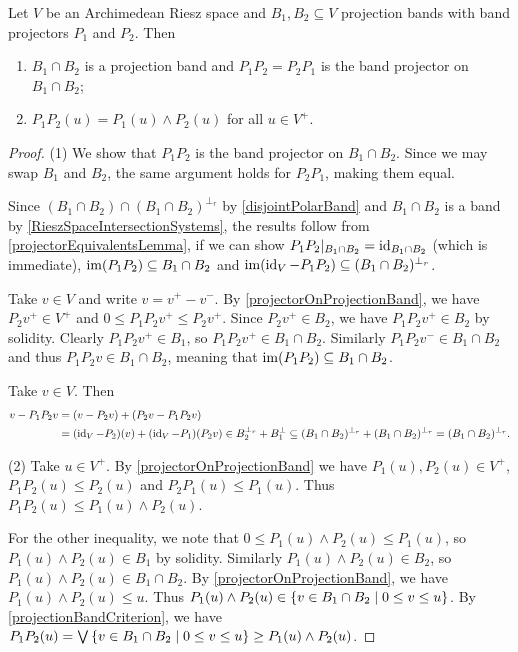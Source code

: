 \begin{proposition} \label{intersectionProjectionBands}
Let $V$ be an Archimedean Riesz space and $B_1,B_2\subseteq V$ projection bands with band projectors $P_1$ and $P_2$. Then
\begin{enumerate}
\item $B_1 \cap B_2$ is a projection band and $P_1P_2 = P_2P_1$ is the band projector on $B_1 \cap B_2$;
\item $P_1P_2(u) = P_1(u)\wedge P_2(u)$ for all $u\in V^+$.
\end{enumerate}
\end{proposition}
\begin{proof}
(1) We show that $P_1P_2$ is the band projector on $B_1 \cap B_2$. Since we may swap $B_1$ and $B_2$, the same argument holds for $P_2P_1$, making them equal.

Since $(B_1 \cap B_2) \cap (B_1 \cap B_2)^{\perp_r}$ by \ref{disjointPolarBand} and $B_1\cap B_2$ is a band by \ref{RieszSpaceIntersectionSystems}, the results follow from \ref{projectorEquivalentsLemma}, if we can show $P_1P_2|_{B_1 \cap B_2} = \operatorname{id}_{B_1 \cap B_2}$ (which is immediate), $\operatorname{im}(P_1P_2)\subseteq B_1 \cap B_2$ and $\operatorname{im}(\operatorname{id}_V - P_1P_2) \subseteq (B_1 \cap B_2)^{\perp_r}$.

Take $v\in V$ and write $v = v^+ - v^-$. By \ref{projectorOnProjectionBand}, we have $P_2v^+ \in V^+$ and $0 \leq P_1P_2v^+ \leq P_2v^+$. Since $P_2v^+\in B_2$, we have $P_1P_2v^+ \in B_2$ by solidity. Clearly $P_1P_2v^+ \in B_1$, so $P_1P_2v^+\in B_1\cap B_2$. Similarly $P_1P_2v^- \in B_1\cap B_2$ and thus $P_1P_2v\in B_1\cap B_2$, meaning that $\operatorname{im}(P_1P_2)\subseteq B_1 \cap B_2$.

Take $v\in V$. Then
\begin{align*}
v - P_1P_2v &= (v-P_2v) + (P_2v - P_1P_2v) \\
&= (\operatorname{id}_V - P_2)(v) + (\operatorname{id}_V - P_1)(P_2 v) \in B_2^{\perp_r} + B_1^{\perp} \subseteq (B_1 \cap B_2)^{\perp_r} + (B_1 \cap B_2)^{\perp_r} = (B_1 \cap B_2)^{\perp_r}.
\end{align*}

(2) Take $u\in V^+$. By \ref{projectorOnProjectionBand} we have $P_1(u), P_2(u) \in V^+$, $P_1P_2(u) \leq P_2(u)$ and $P_2P_1(u)\leq P_1(u)$. Thus $P_1P_2(u) \leq P_1(u) \wedge P_2(u)$.

For the other inequality, we note that $0 \leq P_1(u) \wedge P_2(u) \leq P_1(u)$, so $P_1(u) \wedge P_2(u) \in B_1$ by solidity. Similarly $P_1(u) \wedge P_2(u)\in B_2$, so $P_1(u) \wedge P_2(u)\in B_1\cap B_2$. By \ref{projectorOnProjectionBand}, we have $P_1(u) \wedge P_2(u) \leq u$. Thus $P_1(u) \wedge P_2(u) \in \setbuilder{v\in B_1\cap B_2}{0\leq v\leq u}$. By \ref{projectionBandCriterion}, we have $P_1P_2(u) = \bigvee\setbuilder{v\in B_1\cap B_2}{0\leq v\leq u} \geq P_1(u) \wedge P_2(u)$.
\end{proof}
